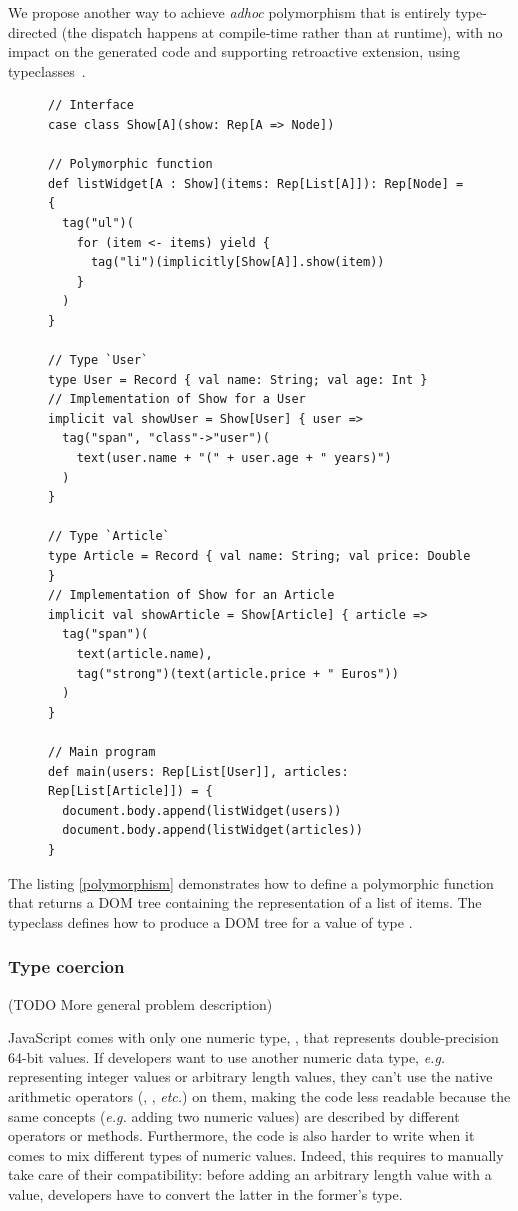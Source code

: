 \documentclass[american,english,runningheads]{llncs}
\newcommand{\eg}{\emph{e.g.}}
\newcommand{\etc}{\emph{etc.}}
\begin{document}
We propose another way to achieve \emph{adhoc} polymorphism that is entirely type-directed (the dispatch happens at compile-time rather than at runtime), with no impact on the generated code and supporting retroactive extension, using typeclasses~\cite{Wadler89_AdhocPolymorphism,Odersky06_Typeclasses,Oliveira10_Typeclasses}.

\begin{figure}
\begin{lstlisting}[label=polymorphism,caption=Adhoc polymorphism using typeclasses]
// Interface
case class Show[A](show: Rep[A => Node])

// Polymorphic function
def listWidget[A : Show](items: Rep[List[A]]): Rep[Node] = {
  tag("ul")(
    for (item <- items) yield {
      tag("li")(implicitly[Show[A]].show(item))
    }
  )
}

// Type `User`
type User = Record { val name: String; val age: Int }
// Implementation of Show for a User
implicit val showUser = Show[User] { user =>
  tag("span", "class"->"user")(
    text(user.name + "(" + user.age + " years)")
  )
}

// Type `Article`
type Article = Record { val name: String; val price: Double }
// Implementation of Show for an Article
implicit val showArticle = Show[Article] { article =>
  tag("span")(
    text(article.name),
    tag("strong")(text(article.price + " Euros"))
  )
}

// Main program
def main(users: Rep[List[User]], articles: Rep[List[Article]]) = {
  document.body.append(listWidget(users))
  document.body.append(listWidget(articles))
}
\end{lstlisting}
\end{figure}

The listing \ref{polymorphism} demonstrates how to define a polymorphic  function that returns a DOM tree containing the representation of a list of items. The  typeclass defines how to produce a DOM tree for a value of type .

\subsubsection{Type coercion}

(TODO More general problem description)

JavaScript comes with only one numeric type, , that represents double-precision 64-bit values. If developers want to use another numeric data type, \eg{} representing integer values or arbitrary length values, they can’t use the native arithmetic operators (\code{+}, \code{-}, \etc) on them, making the code less readable because the same concepts (\eg{} adding two numeric values) are described by different operators or methods. Furthermore, the code is also harder to write when it comes to mix different types of numeric values. Indeed, this requires to manually take care of their compatibility: before adding an arbitrary length value with a  value, developers have to convert the latter in the former’s type.
\end{document}
